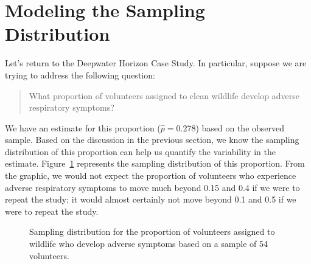 \documentclass[
  letterpaper,
  DIV=11,
  numbers=noendperiod]{scrreprt}
\theoremstyle{plain}
\theoremstyle{definition}
\theoremstyle{definition}
\theoremstyle{remark}
\begin{document}
\section{Modeling the Sampling
Distribution}\label{modeling-the-sampling-distribution}

Let's return to the Deepwater Horizon Case Study. In particular, suppose
we are trying to address the following question:

\begin{quote}
What proportion of volunteers assigned to clean wildlife develop adverse
respiratory symptoms?
\end{quote}

We have an estimate for this proportion (\(\widehat{p} = 0.278\)) based
on the observed sample. Based on the discussion in the previous section,
we know the sampling distribution of this proportion can help us
quantify the variability in the estimate.
Figure~\ref{fig-samplingdistns-deepwater-histogram} represents the
sampling distribution of this proportion. From the graphic, we would not
expect the proportion of volunteers who experience adverse respiratory
symptoms to move much beyond 0.15 and 0.4 if we were to repeat the
study; it would almost certainly not move beyond 0.1 and 0.5 if we were
to repeat the study.

\begin{figure}


\caption{\label{fig-samplingdistns-deepwater-histogram}Sampling
distribution for the proportion of volunteers assigned to wildlife who
develop adverse symptoms based on a sample of 54 volunteers.}

\end{figure}%
\end{document}
